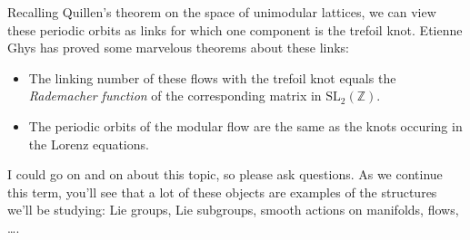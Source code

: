 \documentclass[11pt,twoside]{amsart}
\theoremstyle{plain}
\theoremstyle{remark}
\theoremstyle{definition}
\theoremstyle{definition}
\newcommand{\ZZ}{\mathbb{Z}}
\newcommand{\SL}{\mathrm{SL}}
\begin{document}
Recalling Quillen's theorem on the space of unimodular lattices, we can view these periodic orbits as links for which one component is the trefoil knot. Etienne Ghys has proved some marvelous theorems about these links:
\begin{itemize}
\item The linking number of these flows with the trefoil knot equals the \emph{Rademacher function} of the corresponding matrix in $\SL_2(\ZZ)$.
\item The periodic orbits of the modular flow are the same as the knots occuring in the Lorenz equations.
\end{itemize}

I could go on and on about this topic, so please ask questions. As we continue this term, you'll see that a lot of these objects are examples of the structures we'll be studying: Lie groups, Lie subgroups, smooth actions on manifolds, flows, \ldots.
\end{document}
